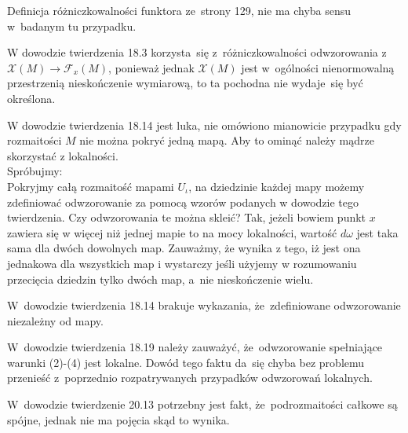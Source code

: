 \documentclass[a4paper,11pt]{article}
\begin{document}
\vspace{\spaceFour}


\start {} Definicja różniczkowalności funktora ze~strony 129,
nie ma chyba sensu w~badanym tu przypadku.

\vspace{\spaceFour}


\start {} W dowodzie twierdzenia 18.3 korzysta~się
z~różniczkowalności odwzorowania
z~$\mathcal{X}( M ) \to \mathcal{F}_{ x }( M )$, ponieważ jednak
$\mathcal{X}( M )$ jest w~ogólności nienormowalną przestrzenią
nieskończenie wymiarową, to ta pochodna nie wydaje~się być określona.

\vspace{\spaceFour}


\start {} W dowodzie twierdzenia 18.14 jest luka, nie omówiono mianowicie przypadku gdy rozmaitości $M$ nie można pokryć jedną mapą. Aby to ominąć należy mądrze skorzystać z lokalności. \\Spróbujmy:\\
Pokryjmy całą rozmaitość mapami $U_{ \iota }$, na dziedzinie każdej
mapy możemy zdefiniować odwzorowanie za pomocą wzorów podanych w
dowodzie tego twierdzenia. Czy odwzorowania te można skleić? Tak,
jeżeli bowiem punkt $x$ zawiera się w więcej niż jednej mapie to na
mocy lokalności, wartość $d \omega$ jest taka sama dla dwóch dowolnych
map. Zauważmy, że wynika z tego, iż jest ona jednakowa dla wszystkich
map i wystarczy jeśli użyjemy w rozumowaniu przecięcia dziedzin tylko
dwóch map, a~nie nieskończenie wielu.

\vspace{\spaceFour}


\start {} W~dowodzie twierdzenia 18.14 brakuje wykazania,
że~zdefiniowane odwzorowanie niezależny od mapy.

\vspace{\spaceFour}


\start {} W~dowodzie twierdzenia 18.19 należy zauważyć,
że~odwzorowanie spełniające warunki (2)-(4) jest lokalne. Dowód tego
faktu da~się chyba bez problemu przenieść z~poprzednio rozpatrywanych
przypadków odwzorowań lokalnych.

\vspace{\spaceFour}


\start {} W~dowodzie twierdzenie 20.13 potrzebny jest fakt,
że~podrozmaitości całkowe są spójne, jednak nie ma pojęcia skąd to
wynika.

\vspace{\spaceFour}
\end{document}
